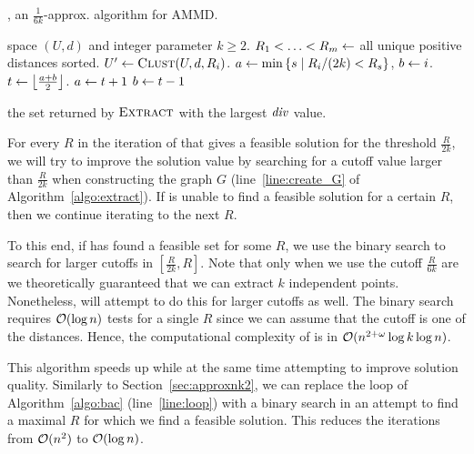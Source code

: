 \begin{algorithm}[t]
\caption{, an $\frac{1}{6k}$-approx. algorithm for AMMD.}\label{algo:bacb} 
\begin{algorithmic}[1]
\Require space $(U, d)$ and integer parameter $k\geq 2$.
\State $R_1 < \ldots < R_{m} \leftarrow $ all unique positive distances sorted.
	\State ${U}' \define \algclust{U, d, R_i}$. 
		\State $a \leftarrow \min\left\{s \mid R_i / (2k) < R_s\right\}$, $b \leftarrow i$.
			\State $t \leftarrow {\left\lfloor\frac{a+b}{2}\right\rfloor}$.
				$a \leftarrow t + 1$
			\Else{}
				$b \leftarrow t - 1$
			\EndIf
		\EndWhile
	\EndIf
\EndFor 

\Ensure the set returned by $\algextract{}$ with the largest $\diver{}$ value.
\end{algorithmic}
\end{algorithm}


For every $R$ in the iteration of \algbacb{}
that gives a feasible solution for the threshold $\frac{R}{2k}$, we will try to
improve the solution value by searching for a cutoff value larger than
$\frac{R}{2k}$ when constructing the graph $G$ (line~\ref{line:create_G} of Algorithm~\ref{algo:extract}).
If \algbacb{} is unable to find a feasible solution for a
certain $R$, then we continue
iterating to the next $R$. 

To this end, if \algbacb{} has found a feasible set for some $R$, we use the binary search
to search for larger cutoffs in $[\frac{R}{2k},R]$.
Note that only when we use the cutoff $
\frac{R}{6k}$ are we theoretically guaranteed that we can extract $k$
independent points. Nonetheless, \algbacb{} will attempt to do this for larger
cutoffs as well. The binary search requires $\mathcal{O}(\log n)$ tests for
a single $R$ since we can assume that the cutoff is one of the distances. Hence,
the computational complexity of \algbacb{} is in $\mathcal{O}(n^{2+\omega} \log k \log
n)$.


 This algorithm speeds up \algbac{} while at the same time attempting to improve solution quality. Similarly to Section~\ref{sec:approxnk2}, we can replace the loop of Algorithm~\ref{algo:bac} (line~\ref{line:loop}) with a binary search in an attempt to find a maximal $R$ for which we find a feasible solution. This reduces the iterations from $\mathcal{O}(n^2)$ to $\mathcal{O}(\log n)$.

